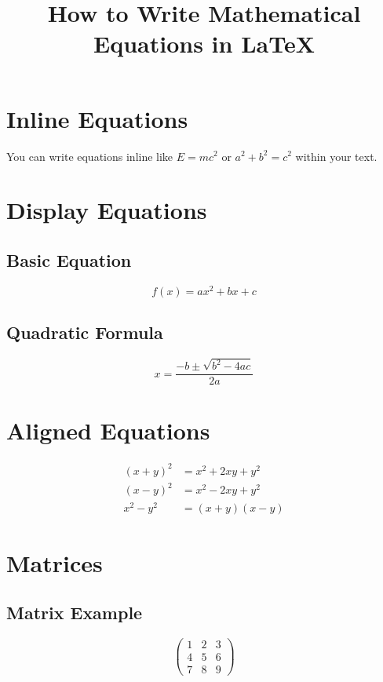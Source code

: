 \documentclass{article}
\title{How to Write Mathematical Equations in LaTeX}
\author{}
\date{}
\begin{document}
\maketitle

\section{Inline Equations}
You can write equations inline like $E = mc^2$ or $a^2 + b^2 = c^2$ within your text.

\section{Display Equations}

\subsection{Basic Equation}
\begin{equation}
    f(x) = ax^2 + bx + c
    \label{eq:quadratic}
\end{equation}

\subsection{Quadratic Formula}
\begin{equation}
    x = \frac{-b \pm \sqrt{b^2 - 4ac}}{2a}
    \label{eq:quadratic_formula}
\end{equation}

\section{Aligned Equations}

\begin{align}
    (x+y)^2 &= x^2 + 2xy + y^2 \\
    (x-y)^2 &= x^2 - 2xy + y^2 \\
    x^2 - y^2 &= (x+y)(x-y)
\end{align}

\section{Matrices}

\subsection{Matrix Example}
\begin{equation}
    \begin{pmatrix}
        1 & 2 & 3 \\
        4 & 5 & 6 \\
        7 & 8 & 9
    \end{pmatrix}
\end{equation}
\end{document}
